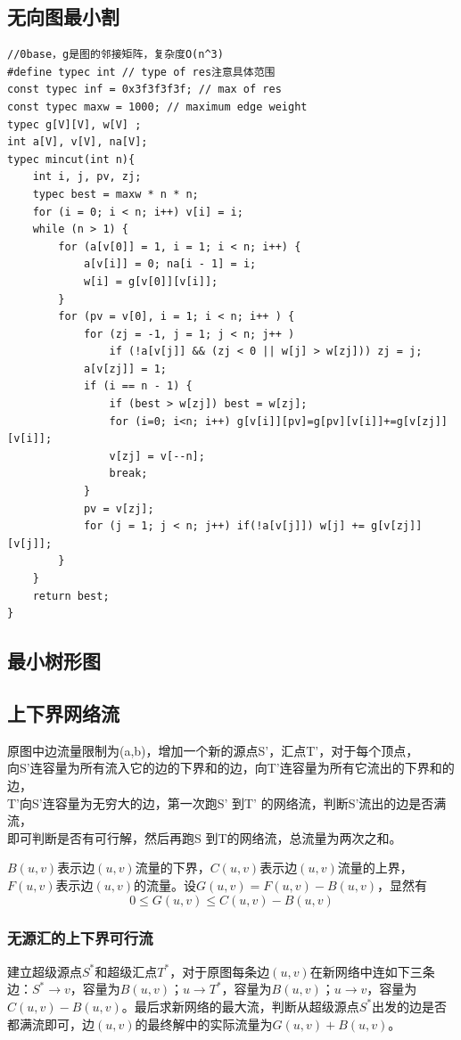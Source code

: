 \documentclass[landscape,a4paper]{article}
\begin{document}
\begin{spacing}{0.3}
\begin{multicols}{2}
	\subsection{无向图最小割}
\begin{lstlisting}
//0base，g是图的邻接矩阵，复杂度O(n^3)
#define typec int // type of res注意具体范围
const typec inf = 0x3f3f3f3f; // max of res
const typec maxw = 1000; // maximum edge weight
typec g[V][V], w[V] ;
int a[V], v[V], na[V];
typec mincut(int n){
	int i, j, pv, zj;
	typec best = maxw * n * n;
	for (i = 0; i < n; i++) v[i] = i;
	while (n > 1) {
		for (a[v[0]] = 1, i = 1; i < n; i++) {
			a[v[i]] = 0; na[i - 1] = i;
			w[i] = g[v[0]][v[i]];
		}
		for (pv = v[0], i = 1; i < n; i++ ) {
			for (zj = -1, j = 1; j < n; j++ )
				if (!a[v[j]] && (zj < 0 || w[j] > w[zj])) zj = j;
			a[v[zj]] = 1;
			if (i == n - 1) {
				if (best > w[zj]) best = w[zj];
				for (i=0; i<n; i++) g[v[i]][pv]=g[pv][v[i]]+=g[v[zj]][v[i]];
				v[zj] = v[--n];
				break;
			}
			pv = v[zj];
			for (j = 1; j < n; j++) if(!a[v[j]]) w[j] += g[v[zj]][v[j]];
		}
	}
	return best;
}
\end{lstlisting}
\subsection{最小树形图}
	
	\subsection{上下界网络流}
原图中边流量限制为(a,b)，增加一个新的源点S’，汇点T’，对于每个顶点，\\
向S’连容量为所有流入它的边的下界和的边，向T’连容量为所有它流出的下界和的边，\\
T’向S’连容量为无穷大的边，第一次跑S’ 到T’ 的网络流，判断S’流出的边是否满流，\\
即可判断是否有可行解，然后再跑S 到T的网络流，总流量为两次之和。

$B(u,v)$表示边$(u,v)$流量的下界，$C(u,v)$表示边$(u,v)$流量的上界，$F(u,v)$表示边$(u,v)$的流量。设$G(u,v) = F(u,v) - B(u,v)$，显然有
	$$0 \leq G(u,v) \leq C(u,v)-B(u,v)$$

\subsubsection{无源汇的上下界可行流}

建立超级源点$S^*$和超级汇点$T^*$，对于原图每条边$(u,v)$在新网络中连如下三条边：$S^* \rightarrow v$，容量为$B(u,v)$；$u \rightarrow T^*$，容量为$B(u,v)$；$u \rightarrow v$，容量为$C(u,v) - B(u,v)$。最后求新网络的最大流，判断从超级源点$S^*$出发的边是否都满流即可，边$(u,v)$的最终解中的实际流量为$G(u,v)+B(u,v)$。


\end{multicols}
\end{spacing}
\end{document}
